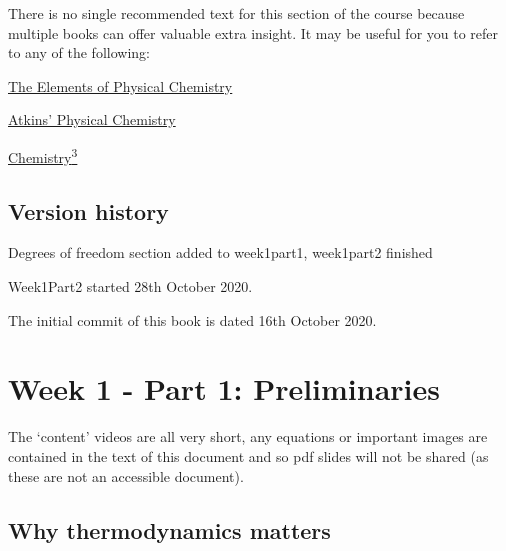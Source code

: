 \documentclass[
]{book}
\begin{document}
There is no single recommended text for this section of the course because multiple books can offer valuable extra insight. It may be useful for you to refer to any of the following:

\href{https://bath-ac-primo.hosted.exlibrisgroup.com/primo-explore/search?query=any,contains,Elements\%20of\%20physical\%20chemistry\&tab=local\&sortby=date\&vid=44BAT_VU1\&facet=frbrgroupid,include,978286819\&offset=0\&pcAvailability=false}{The Elements of Physical Chemistry}

\href{https://bath-ac-primo.hosted.exlibrisgroup.com/primo-explore/search?query=any,contains,physical\%20chemistry\%20de\%20paula\&tab=local\&search_scope=CSCOP_44BAT_DEEP\&sortby=date\&vid=44BAT_VU1\&facet=frbrgroupid,include,978327499\&offset=0\&pcAvailability=false}{Atkins' Physical Chemistry}

\href{https://bath-ac-primo.hosted.exlibrisgroup.com/primo-explore/search?query=any,contains,chemistry3\&tab=local\&search_scope=CSCOP_44BAT_DEEP\&sortby=date\&vid=44BAT_VU1\&facet=frbrgroupid,include,978293871\&offset=0\&pcAvailability=false}{Chemistry\textsuperscript{3}}

\hypertarget{version-history}{%
\section*{Version history}\label{version-history}}

Degrees of freedom section added to week1part1, week1part2 finished

Week1Part2 started 28th October 2020.

The initial commit of this book is dated 16th October 2020.

\hypertarget{ch:Part1}{%
\chapter{Week 1 - Part 1: Preliminaries}\label{ch:Part1}}

The `content' videos are all very short, any equations or important images are contained in the text of this document and so pdf slides will not be shared (as these are not an accessible document).

\hypertarget{sec:whyjustwhy}{%
\section{Why thermodynamics matters}\label{sec:whyjustwhy}}
\end{document}
